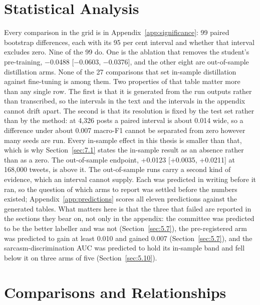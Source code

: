 \section{Statistical Analysis}
\label{sec:5.stats}
Every comparison in the grid is in Appendix~\ref{app:significance}: 99 paired bootstrap differences,
each with its 95 per cent interval and whether that interval excludes zero. Nine of the 99 do. One
is the ablation that removes the student's pre-training, $-$0.0488 [$-$0.0603, $-$0.0376], and the
other eight are out-of-sample distillation arms. None of the 27 comparisons that set in-sample
distillation against fine-tuning is among them.
Two properties of that table matter more than any single row. The first is that it is generated from
the run outputs rather than transcribed, so the intervals in the text and the intervals in the
appendix cannot drift apart. The second is that its resolution is fixed by the test set rather than
by the method: at 4,326 posts a paired interval is about 0.014 wide, so a difference under about
0.007 macro-F1 cannot be separated from zero however many seeds are run. Every in-sample effect in
this thesis is smaller than that, which is why Section~\ref{sec:7.1} states the in-sample result as
an absence rather than as a zero. The out-of-sample endpoint, +0.0123 [+0.0035, +0.0211] at 168,000
tweets, is above it.
The out-of-sample runs carry a second kind of evidence, which an interval cannot supply. Each was
predicted in writing before it ran, so the question of which arms to report was settled before the
numbers existed; Appendix~\ref{app:predictions} scores all eleven predictions against the generated
tables. What matters here is that the three that failed are reported in the sections they bear on,
not only in the appendix: the committee was predicted to be the better labeller and was not
(Section~\ref{sec:5.7}), the pre-registered arm was predicted to gain at least 0.010 and gained
0.007 (Section~\ref{sec:5.7}), and the sarcasm-discrimination AUC was predicted to hold its
in-sample band and fell below it on three arms of five (Section~\ref{sec:5.10}).
\section{Comparisons and Relationships}
\label{sec:5.compare}
